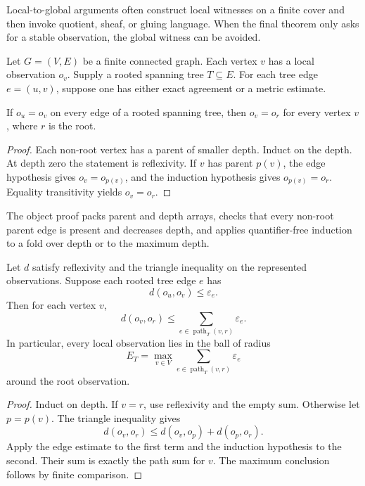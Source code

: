 Local-to-global arguments often construct local witnesses on a finite cover and then invoke quotient, sheaf, or gluing language.  When the final theorem only asks for a stable observation, the global witness can be avoided.

Let \(G=(V,E)\) be a finite connected graph.  Each vertex \(v\) has a local observation \(o_v\).  Supply a rooted spanning tree \(T\subseteq E\).  For each tree edge \(e=(u,v)\), suppose one has either exact agreement or a metric estimate.

\begin{theorem}
\label{thm:exact-descent}
If \(o_u=o_v\) on every edge of a rooted spanning tree, then \(o_v=o_r\) for every vertex \(v\), where \(r\) is the root.
\end{theorem}

\begin{proof}
Each non-root vertex has a parent of smaller depth.  Induct on the depth.  At depth zero the statement is reflexivity.  If \(v\) has parent \(p(v)\), the edge hypothesis gives \(o_v=o_{p(v)}\), and the induction hypothesis gives \(o_{p(v)}=o_r\).  Equality transitivity yields \(o_v=o_r\).
\end{proof}

The object proof packs parent and depth arrays, checks that every non-root parent edge is present and decreases depth, and applies quantifier-free induction to a fold over depth or to the maximum depth.

\begin{theorem}
\label{thm:metric-descent}
Let \(d\) satisfy reflexivity and the triangle inequality on the represented observations.  Suppose each rooted tree edge \(e\) has
\[
 d(o_u,o_v)\leq\varepsilon_e.
\]
Then for each vertex \(v\),
\begin{equation}
 d(o_v,o_r)\leq
 \sum_{e\in\operatorname{path}_T(v,r)}\varepsilon_e.
 \label{eq:tree-error}
\end{equation}
In particular, every local observation lies in the ball of radius
\[
 E_T=\max_{v\in V}\sum_{e\in\operatorname{path}_T(v,r)}\varepsilon_e
\]
around the root observation.
\end{theorem}

\begin{proof}
Induct on depth.  If \(v=r\), use reflexivity and the empty sum.  Otherwise let \(p=p(v)\).  The triangle inequality gives
\[
 d(o_v,o_r)\leq d(o_v,o_p)+d(o_p,o_r).
\]
Apply the edge estimate to the first term and the induction hypothesis to the second.  Their sum is exactly the path sum for \(v\).  The maximum conclusion follows by finite comparison.
\end{proof}

